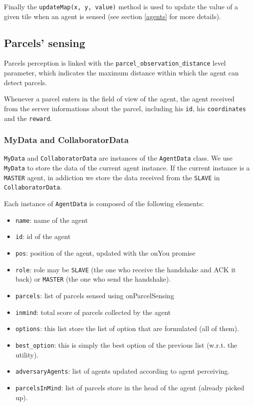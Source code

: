 \documentclass[12pt]{article}
\begin{document}
Finally the \texttt{updateMap(x, y, value)} method is used to update the value of a given tile when an agent is sensed (see section \ref{agents} for more details).

\subsection{Parcels' sensing}

Parcels perception is linked with the \texttt{parcel\_observation\_distance} level parameter, which indicates the maximum distance within which the agent can detect parcels. 

Whenever a parcel enters in the field of view of the agent, the agent received from the server informations about the parcel, including his \texttt{id}, his \texttt{coordinates} and the \texttt{reward}.    

\subsubsection{MyData and CollaboratorData}

\texttt{MyData} and \texttt{CollaboratorData} are instances of the \texttt{AgentData} class. We use \texttt{MyData} to store the data of the current agent instance. If the current instance is a \texttt{MASTER} agent, in addiction we store the data received from the \texttt{SLAVE} in \texttt{CollaboratorData}.

Each instance of \texttt{AgentData} is composed of the following elements:

\begin{itemize}
    \item \texttt{name}: name of the agent
    \item \texttt{id}: id of the agent
    \item \texttt{pos}: position of the agent, updated with the onYou promise
    \item \texttt{role}: role may be \texttt{SLAVE} (the one who receive the handshake and ACK it back) or \texttt{MASTER} (the one who send the handshake). 
    \item \texttt{parcels}: list of parcels sensed using onParcelSensing
    \item \texttt{inmind}: total score of parcels collected by the agent
    \item \texttt{options}: this list store the list of option that are formulated (all of them).
    \item \texttt{best\_option}: this is simply the best option of the previous list (w.r.t. the utility).
    \item \texttt{adversaryAgents}: list of agents updated according to agent perceiving. 
    \item \texttt{parcelsInMind}: list of parcels store in the head of the agent (already picked up).
\end{itemize}
\end{document}

